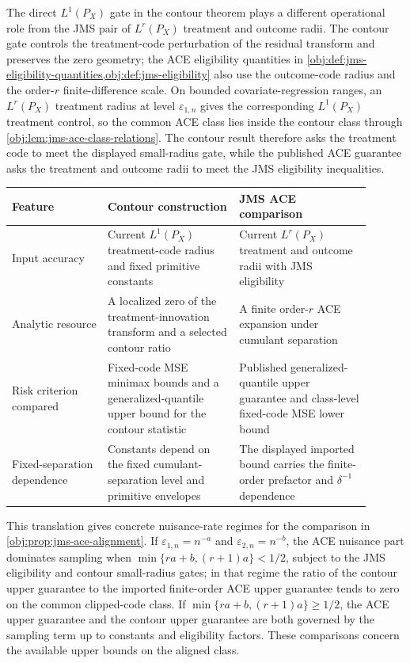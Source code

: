 \documentclass[11pt]{article}
\begin{document}
The direct \(L^1(P_X)\) gate in the contour theorem plays a different operational role from the JMS pair of \(L^r(P_X)\) treatment and outcome radii. The contour gate controls the treatment-code perturbation of the residual transform and preserves the zero geometry; the ACE eligibility quantities in \cref{obj:def:jms-eligibility-quantities,obj:def:jms-eligibility} also use the outcome-code radius and the order-\(r\) finite-difference scale. On bounded covariate-regression ranges, an \(L^r(P_X)\) treatment radius at level \(\varepsilon_{1,n}\) gives the corresponding \(L^1(P_X)\) treatment control, so the common ACE class lies inside the contour class through \cref{obj:lem:jms-ace-class-relations}. The contour result therefore asks the treatment code to meet the displayed small-radius gate, while the published ACE guarantee asks the treatment and outcome radii to meet the JMS eligibility inequalities.

\begin{center}
\begin{tabular}{p{0.24\linewidth}p{0.33\linewidth}p{0.33\linewidth}}
\hline
Feature & Contour construction & JMS ACE comparison \\
\hline
Input accuracy & Current \(L^1(P_X)\) treatment-code radius and fixed primitive constants & Current \(L^r(P_X)\) treatment and outcome radii with JMS eligibility \\
Analytic resource & A localized zero of the treatment-innovation transform and a selected contour ratio & A finite order-\(r\) ACE expansion under cumulant separation \\
Risk criterion compared & Fixed-code MSE minimax bounds and a generalized-quantile upper bound for the contour statistic & Published generalized-quantile upper guarantee and class-level fixed-code MSE lower bound \\
Fixed-separation dependence & Constants depend on the fixed cumulant-separation level and primitive envelopes & The displayed imported bound carries the finite-order prefactor and \(\delta^{-1}\) dependence \\
\hline
\end{tabular}
\end{center}

This translation gives concrete nuisance-rate regimes for the comparison in \cref{obj:prop:jms-ace-alignment}. If \(\varepsilon_{1,n}=n^{-a}\) and \(\varepsilon_{2,n}=n^{-b}\), the ACE nuisance part dominates sampling when \(\min\{ra+b,(r+1)a\}<1/2\), subject to the JMS eligibility and contour small-radius gates; in that regime the ratio of the contour upper guarantee to the imported finite-order ACE upper guarantee tends to zero on the common clipped-code class. If \(\min\{ra+b,(r+1)a\}\ge1/2\), the ACE upper guarantee and the contour upper guarantee are both governed by the sampling term up to constants and eligibility factors. These comparisons concern the available upper bounds on the aligned class.
\end{document}
